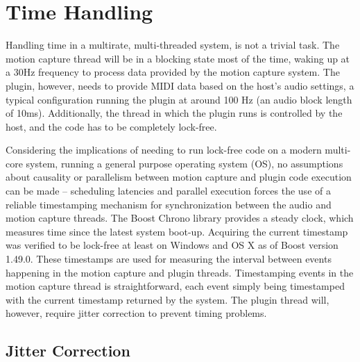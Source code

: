 \section{Time Handling}
\label{sec:time_handling}

Handling time in a multirate, multi-threaded system,
is not a trivial task.
The motion capture thread will be in
a blocking state most of the time,
waking up at a 30Hz frequency to process data
provided by the motion capture system.
The plugin, however, needs to provide MIDI data
based on the host's audio settings,
a typical configuration running the
plugin at around 100 Hz (an audio block length of 10ms).
Additionally, the thread in which the plugin runs
is controlled by the host,
and the code has to be completely lock-free.

Considering the implications of needing to run lock-free code on
a modern multi-core system, running a general purpose
operating system (OS),
no assumptions about causality or parallelism between
motion capture and plugin code execution can be made --
scheduling latencies and parallel execution forces the use
of a reliable timestamping mechanism for synchronization between
the audio and motion capture threads.
The Boost Chrono library provides a steady clock,
which measures time since the latest system boot-up.
Acquiring the current timestamp was verified to be lock-free
at least on Windows and OS X as of Boost version 1.49.0.
These timestamps are used for measuring the interval between
events happening in the motion capture and plugin threads.
Timestamping events in the motion capture thread is straightforward,
each event simply being timestamped with
the current timestamp returned by the system.
The plugin thread will, however,
require jitter correction to prevent timing problems.

\subsection{Jitter Correction}

